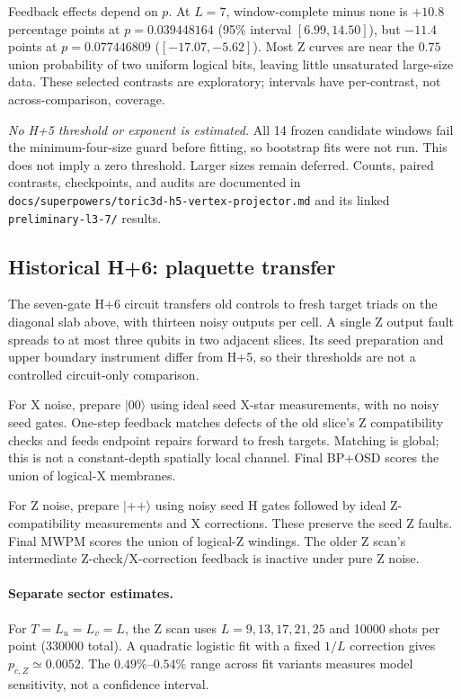 \documentclass[11pt]{article}
\theoremstyle{definition}
\begin{document}
Feedback effects depend on $p$. At $L=7$, window-complete minus none is
$+10.8$ percentage points at $p=0.039448164$ (95\% interval
$[6.99,14.50]$), but $-11.4$ points at $p=0.077446809$
($[-17.07,-5.62]$). Most Z curves are near the $0.75$ union probability
of two uniform logical bits, leaving little unsaturated large-size data.
These selected contrasts are exploratory; intervals have per-contrast,
not across-comparison, coverage.

\emph{No H+5 threshold or exponent is estimated.} All 14 frozen candidate
windows fail the minimum-four-size guard before fitting, so bootstrap fits
were not run. This does not imply a zero threshold. Larger sizes remain
deferred. Counts, paired contrasts, checkpoints, and audits are documented
in \texttt{docs/superpowers/toric3d-h5-vertex-projector.md} and its linked
\texttt{preliminary-l3-7/} results.

\subsection{Historical H+6: plaquette transfer}

The seven-gate H+6 circuit transfers old controls to fresh target triads
on the diagonal slab above, with thirteen noisy outputs per cell.
A single Z output fault spreads to at most three qubits in two adjacent
slices. Its seed preparation and upper boundary instrument differ from
H+5, so their thresholds are not a controlled circuit-only comparison.

For X noise, prepare $|00\rangle$ using ideal seed X-star measurements,
with no noisy seed gates. One-step feedback matches defects of the old
slice's Z compatibility checks and feeds endpoint repairs forward to fresh
targets. Matching is global; this is not a constant-depth spatially local
channel. Final BP+OSD scores the union of logical-X membranes.

For Z noise, prepare $|++\rangle$ using noisy seed H gates followed by
ideal Z-compatibility measurements and X corrections. These preserve the
seed Z faults. Final MWPM scores the union of logical-Z windings. The
older Z scan's intermediate Z-check/X-correction feedback is inactive
under pure Z noise.

\paragraph{Separate sector estimates.}
For $T=L_u=L_v=L$, the Z scan uses $L=9,13,17,21,25$ and 10000 shots per point
(330000 total). A quadratic logistic fit with a fixed $1/L$ correction
gives $p_{c,Z}\simeq0.0052$. The $0.49\%$--$0.54\%$ range across fit
variants measures model sensitivity, not a confidence interval.
\end{document}
